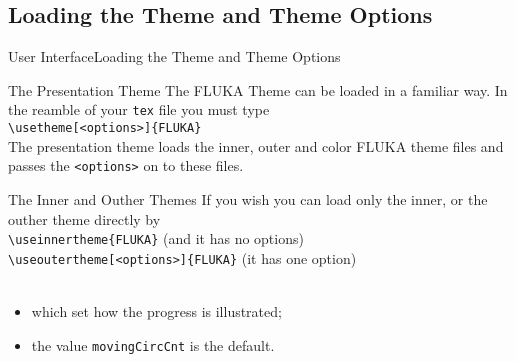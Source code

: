 \documentclass[10pt]{beamer}
\begin{document}
\subsection{Loading the Theme and Theme Options}
\begin{frame}{User Interface}{Loading the Theme and Theme Options}

  \begin{block}{The Presentation Theme}
    The FLUKA Theme can be loaded in a familiar way. In the reamble of your {\tt tex} file you must type\\ \vspace{5pt}
    {\tt \textbackslash usetheme[<options>]\{FLUKA\}}\\ \vspace{5pt}
    The presentation theme loads the inner, outer and color FLUKA theme files and passes the {\tt <options>} on to these files.
  \end{block}
  \begin{block}{The Inner and Outher Themes}
    If you wish you can load only the inner, or the outher theme directly by\\ \vspace{5pt}
    {\tt \textbackslash useinnertheme\{FLUKA\}} (and it has no options)\\ \vspace{5pt}
    {\tt \textbackslash useoutertheme[<options>]\{FLUKA\}} (it has one option)\\
     \\
    \begin{itemize}
    \item which set how the progress is illustrated;
    \item the value {\tt movingCircCnt} is the default.
    \end{itemize}
  \end{block}
\end{frame}
\end{document}
